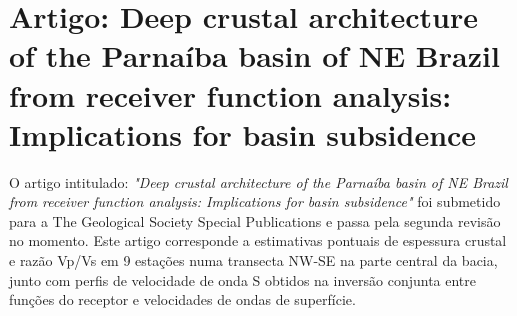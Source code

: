 \chapter{Artigo: Deep crustal architecture of the Parnaíba basin of NE Brazil from receiver function
analysis: Implications for basin subsidence}

O artigo intitulado: \textit{"Deep crustal architecture of the Parnaíba basin of NE Brazil from receiver function analysis: Implications for basin subsidence"} foi submetido para a The Geological Society Special Publications e passa pela segunda revisão no momento. Este artigo corresponde a estimativas pontuais de espessura crustal e razão Vp/Vs em 9 estações numa transecta NW-SE na parte central da bacia, junto com perfis de velocidade de onda S obtidos na inversão conjunta entre funções do receptor e velocidades de ondas de superfície. 

